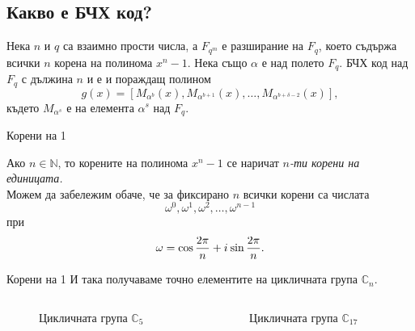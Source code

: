 \documentclass[numbering=fraction]{beamer}
\begin{document}
\begin{frame}[plain]
\section{Какво е БЧХ код?}
\end{frame}

\begin{frame}
\begin{definition}
\bigskip
Нека $n$ и $q$ са взаимно прости числа, а $F_{q^m}$ е разширание на $F_q$, което
съдържа всички $n$ корена на полинома $x^n - 1$. Нека също $\alpha$ е
 над
полето $F_q$. БЧХ код над $F_q$ с дължина $n$ и 
е  и пораждащ полином \[
g(x) = [M_{\alpha^b}(x), M_{\alpha^{b + 1}}(x), \dots, M_{\alpha^{b + \delta
		- 2}}(x)],
\]
където $M_{\alpha^s}$ е  на елемента $\alpha ^ s$ над $F_q$.
\end{definition}
\end{frame}

\begin{frame}{Корени на 1}
\begin{definition}
\smallskip
Ако $n \in \mathbb{N}$, то корените на полинома $x^n - 1$ се наричат \emph{$n$-ти корени на единицата.}
\pause \\
\bigskip
Можем да забележим обаче, че за фиксирано $n$ всички корени са числата
\[
\omega^0, \omega^1, \omega^2, \dots, \omega^{n - 1}
\]при
\[
\omega = \cos{\frac{2\pi}{n}} + {i\mkern1mu}\sin{\frac{2\pi}{n}}.
\]
\end{definition}
\end{frame}

\begin{frame}{Корени на 1}
И така получаваме точно елементите на цикличната група $\mathbb{C}_n$. \\

\begin{columns}[T] %
\begin{column}{.48\textwidth}
\begin{figure}
\vspace*{-2em}
\caption{Цикличната група $\mathbb{C}_5$}
\end{figure}
\end{column}
\hfill
\begin{column}{.48\textwidth}
\begin{figure}
\vspace*{-2em}
\caption{Цикличната група $\mathbb{C}_{17}$}
\end{figure}
\end{column}
\end{columns}

\end{frame}
\end{document}
